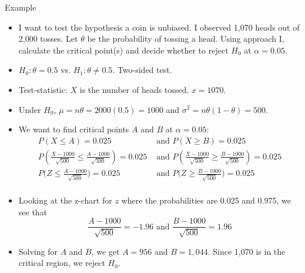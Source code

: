 \documentclass[10pt, xcolor=table]{beamer}
\begin{document}
\begin{frame}{Example}
\begin{itemize}
\setlength{\itemsep}{5pt}
\item I want to test the hypothesis a coin is unbiased. I observed 1,070 heads out of 2,000 tosses. Let $\theta$ be the probability of tossing a head. Using approach I, calculate the critical point(s) and decide whether to reject $H_0$ at $\alpha = 0.05$.
\footnotesize
\item<2->[Ans:] \color{red} $H_0: \theta = 0.5$ vs. $H_1: \theta \neq 0.5$. Two-sided test.
\item<2->[] \color{red} Test-statistic: $X$ is the number of heads tossed. $x = 1070$.
\item<2->[] \color{red} Under $H_0$, $\mu = n\theta = 2000(0.5) = 1000$ and $\sigma^2 = n\theta(1-\theta) = 500$.
\item<2->[] \color{red} We want to find critical points $A$ and $B$ at $\alpha = 0.05$:
\begin{align*}
P(X \leq A) = 0.025 &\text{ and } P(X \geq B) = 0.025\\
P\left(\frac{X - 1000}{\sqrt{500}} \leq \frac{A - 1000}{\sqrt{500}}\right) =0.025 &\text{ and } P\left(\frac{X - 1000}{\sqrt{500}} \geq \frac{B - 1000}{\sqrt{500}} \right)=0.025 \\
P\bigg(Z \leq \frac{A - 1000}{\sqrt{500}}\bigg) = 0.025  &\text{ and } P\bigg(Z\geq \frac{B - 1000}{\sqrt{500}}\bigg) = 0.025\\
\end{align*}
\vspace*{-7ex}
\item<2->[] \color{red} Looking at the z-chart for $z$ where the probabilities are 0.025 and 0.975, we see that
\[
\frac{A-1000}{\sqrt{500}} = -1.96 \text{ and } \frac{B - 1000}{\sqrt{500}} = 1.96
\]
\item<2->[] \color{red} Solving for $A$ and $B$, we get $A = 956$ and $B = 1,044$. Since 1,070 is in the critical region, we reject $H_0$.
\end{itemize}
\end{frame}
\end{document}
